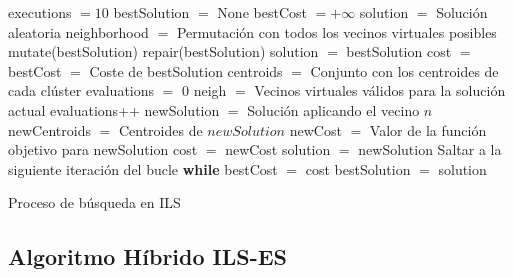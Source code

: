\begin{algorithm}[H]
    \SetAlgoLined
        executions $= 10$ \;
        \BlankLine \BlankLine
        bestSolution $=$ None \;
        bestCost $= +\infty$ \;
        solution $=$ Solución aleatoria \;
        \BlankLine \BlankLine
        neighborhood $=$ Permutación con todos los vecinos virtuales posibles \;
        \BlankLine \BlankLine
         {
            mutate(bestSolution) \;
            repair(bestSolution) \;
            \BlankLine \BlankLine
            solution $=$ bestSolution \;
            cost $=$ bestCost $=$ Coste de bestSolution \;
            \BlankLine \BlankLine
            centroids $=$ Conjunto con los centroides de cada clúster \;
            evaluations $=$ 0 \;
            \BlankLine \BlankLine
             {
                neigh $=$ Vecinos virtuales válidos para la solución actual \;
                 {
                    evaluations++ \;
                    newSolution $=$ Solución aplicando el vecino $n$ \;
                    newCentroids $=$ Centroides de $newSolution$ \;
                    newCost $=$ Valor de la función objetivo para newSolution \;
                    \BlankLine \BlankLine
                     {
                        cost $=$ newCost \;
                        solution $=$ newSolution \;
                        Saltar a la siguiente iteración del bucle \textbf{while} \;
                    }
                }
            }
            \BlankLine \BlankLine
             {
                bestCost $=$ cost \;
                bestSolution $=$ solution \;
            }
        }
    \caption{Proceso de búsqueda en ILS}
\end{algorithm}

\newpage


\subsection{Algoritmo Híbrido ILS-ES}


